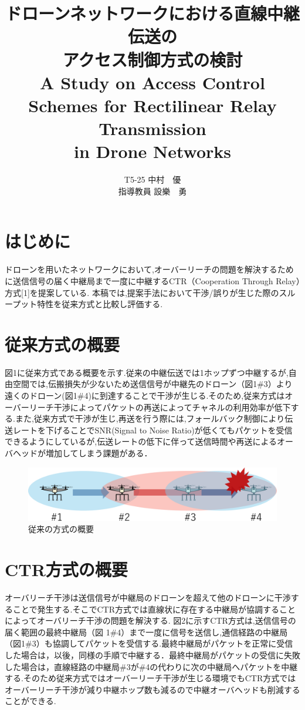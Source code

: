 \documentclass[a4paper,10.5pt]{ltjsarticle}  %
\title{\huge ドローンネットワークにおける直線中継伝送の\\アクセス制御方式の検討\\
\Large A Study on Access Control Schemes for Rectilinear Relay Transmission \\in Drone Networks
}
\author{
T5-25 \:中村　優\\
指導教員 \: 設樂　勇
}
\date{}
\begin{document}
\maketitle

\section{はじめに}
ドローンを用いたネットワークにおいて,オーバーリーチの問題を解決するために送信信号の届く中継局まで一度に中継するCTR（Cooperation Through Relay）方式[1]を提案している. 本稿では,提案手法において干渉/誤りが生じた際のスループット特性を従来方式と比較し評価する.

\section{従来方式の概要}
図1に従来方式である概要を示す.従来の中継伝送では1ホップずつ中継するが,自由空間では,伝搬損失が少ないため送信信号が中継先のドローン（図1\#3）より遠くのドローン(図1\#4)に到達することで干渉が生じる.そのため,従来方式はオーバーリーチ干渉によってパケットの再送によってチャネルの利用効率が低下する.また,従来方式で干渉が生じ,再送を行う際には,フォールバック制御により伝送レートを下げることでSNR(Signal to Noise Ratio)が低くてもパケットを受信できるようにしているが,伝送レートの低下に伴って送信時間や再送によるオーバヘッドが増加してしまう課題がある．

\begin{figure}[H]
  \centering
  \includegraphics[width=\linewidth]{cenventional_topology.pdf} %
  \caption{従来の方式の概要}
  \label{fig:従来の方式のトポロジー} %
\end{figure}

\section{CTR方式の概要}
オーバリーチ干渉は送信信号が中継局のドローンを超えて他のドローンに干渉することで発生する.そこでCTR方式では直線状に存在する中継局が協調することによってオーバリーチ干渉の問題を解決する.
図2に示すCTR方式は,送信信号の届く範囲の最終中継局（図 1\#4）まで一度に信号を送信し,通信経路の中継局（図1\#3）も協調してパケットを受信する.最終中継局がパケットを正常に受信した場合は，以後，同様の手順で中継する．最終中継局がパケットの受信に失敗した場合は，直線経路の中継局\#3が\#4の代わりに次の中継局へパケットを中継する.そのため従来方式ではオーバーリーチ干渉が生じる環境でもCTR方式ではオーバーリーチ干渉が減り中継ホップ数も減るので中継オーバヘッドも削減することができる.
\end{document}
